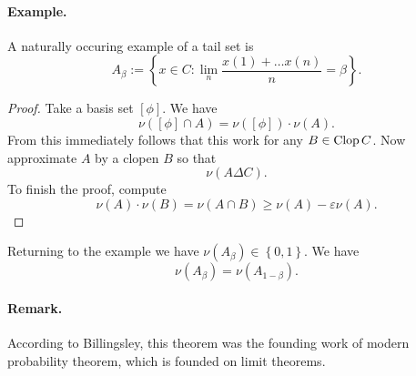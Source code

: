 \paragraph{Example.} A naturally occuring example of a tail set is
\[ 
    A_\beta := \left\{ x \in C : \lim_n \frac{x(1) + \ldots x(n)}{n}= \beta \right\}.
\]


\begin{proof}
Take a basis set \( \left[ \phi \right] \). We have
\[ 
    \nu \left( \left[ \phi \right] \cap A \right) = \nu \left( \left[ \phi \right] \right) \cdot \nu(A).
\]
From this immediately follows that this work for any \( B \in \operatorname{Clop} C \).
Now approximate \( A \) by a clopen \( B \) so that
\[ 
    \nu \left( A \Delta C \right).
\]
To finish the proof, compute
\[ 
    \nu(A) \cdot \nu(B) = \nu( A \cap B ) \geqslant \nu(A) -\varepsilon\nu(A). 
\]
\end{proof}

Returning to the example we have \( \nu(A_\beta) \in \left\{ 0,1 \right\} \). We have
\[ 
    \nu(A_\beta) = \nu (A_{1-\beta}).
\]


\paragraph{Remark.} According to Billingsley, this theorem was the founding work of modern probability theorem, which is founded on limit theorems.
